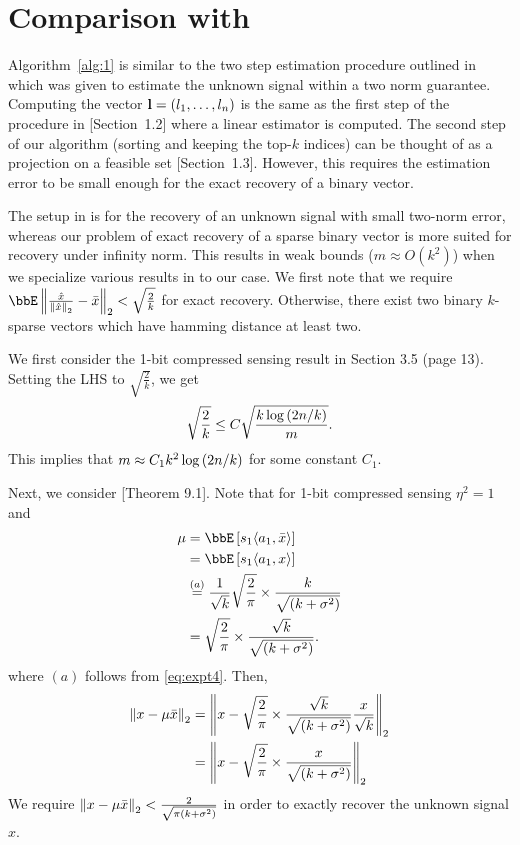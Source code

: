 \section{Comparison with \cite{vershyninPlan}}\label{sec:comparison_PV}
Algorithm~\ref{alg:1} is similar to the two step estimation procedure outlined in \cite{vershyninPlan} which was given to estimate the unknown signal within a two norm guarantee. 
Computing the vector $\mathbf{l} = \left(l_1, \ldots, l_n\right)$ is the same as the first step of the procedure in [Section~1.2]\cite{vershyninPlan} where a linear estimator is computed. The second step of our algorithm (sorting and keeping the top-$k$ indices) can be thought of as a projection on a feasible set [Section~1.3]\cite{vershyninPlan}. However, this requires the estimation error to be small enough for the exact recovery of a binary vector.

The setup in \cite{vershyninPlan} is for the recovery of an unknown signal with small two-norm error, whereas our problem of exact recovery of a sparse binary vector is more suited for recovery under  infinity norm. This results in weak bounds ($m\approx O(k^2)$) when we specialize various results in \cite{vershyninPlan} to our case. We first note that we require $\bbE\norm{\frac{\hat{x}}{\norm{\hat{x}}}-\bar{x}}< \sqrt{\frac{{2}}{{k}}}$ for exact recovery. Otherwise, there exist two binary $k$-sparse vectors which have hamming distance at least two. 

We first consider the 1-bit compressed sensing result in Section 3.5 (page 13). Setting the LHS to $\sqrt{\frac{{2}}{{k}}}$, we get
\begin{align*}
\sqrt{\frac{{2}}{{k}}}\leq C\sqrt{\frac{k\log\left(2n/k\right)}{m}}.
\end{align*}
This implies that $m\approx C_1 k^2\log\left(2n/k\right)$ for some constant $C_1$.

Next, we consider [Theorem 9.1]\cite{vershyninPlan}. Note that for 1-bit compressed sensing $\eta^2 = 1$ and 
\begin{align*}
\mu &= \bbE\insq{s_1\ipr{a_1}{\bar{x}}}\\
& =\bbE\insq{s_1\ipr{a_1}{{x}}}\\
& \stackrel{(a)}{=} \frac{1}{\sqrt{k}}\sqrt{\frac{2}{\pi}}\times\frac{k}{\sqrt{\inp{k+\sigma^2}}}\\
&= \sqrt{\frac{2}{\pi}}\times\frac{\sqrt{k}}{\sqrt{\inp{k+\sigma^2}}}.
\end{align*} where $(a)$ follows from \eqref{eq:expt4}. 
Then, 
\begin{align*}
\left\lVert x-\mu\bar{x}\right\rVert_2 &= \left\lVert x-\sqrt{\frac{2}{\pi}}\times\frac{\sqrt{k}}{\sqrt{\left(k+\sigma^2\right)}}\frac{x}{\sqrt{k}}\right\rVert_2\\
& = \left\lVert x-\sqrt{\frac{2}{\pi}}\times\frac{x}{\sqrt{\left(k+\sigma^2\right)}}\right\rVert_2
\end{align*} We require $\left\lVert x-\mu\bar{x}\right\rVert_2<\frac{2}{\sqrt{\pi\left(k+\sigma^2\right)}}$ in order to exactly recover the unknown signal $x$. 



